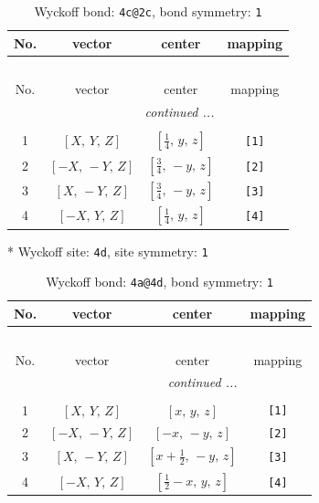 \documentclass[fleqn,8pt]{jsarticle}
\begin{document}
\begin{longtable}{cccc}
\caption{Wyckoff bond: {\tt 4c@2c}, bond symmetry: {\tt 1}}
 \\
 \hline \hline
No. & vector & center & mapping \\ \hline \endfirsthead

\multicolumn{3}{l}{\tablename\ \thetable{}} \\
 \hline \hline
No. & vector & center & mapping \\ \hline \endhead

 \hline \hline
\multicolumn{3}{r}{\footnotesize\it continued ...} \\ \endfoot

 \hline \hline
\multicolumn{3}{r}{} \\ \endlastfoot

1 & $\left[ X,\, Y,\, Z \right]$ & $\left[ \frac{1}{4},\, y,\, z \right]$ & {\tt [1]} \\ \hline
2 & $\left[ - X,\, - Y,\, Z \right]$ & $\left[ \frac{3}{4},\, - y,\, z \right]$ & {\tt [2]} \\ \hline
3 & $\left[ X,\, - Y,\, Z \right]$ & $\left[ \frac{3}{4},\, - y,\, z \right]$ & {\tt [3]} \\ \hline
4 & $\left[ - X,\, Y,\, Z \right]$ & $\left[ \frac{1}{4},\, y,\, z \right]$ & {\tt [4]} \\
\end{longtable}
* Wyckoff site: {\tt 4d}, site symmetry: {\tt 1}
\renewcommand{\arraystretch}{1.2}
\begin{longtable}{cccc}
\caption{Wyckoff bond: {\tt 4a@4d}, bond symmetry: {\tt 1}}
 \\
 \hline \hline
No. & vector & center & mapping \\ \hline \endfirsthead

\multicolumn{3}{l}{\tablename\ \thetable{}} \\
 \hline \hline
No. & vector & center & mapping \\ \hline \endhead

 \hline \hline
\multicolumn{3}{r}{\footnotesize\it continued ...} \\ \endfoot

 \hline \hline
\multicolumn{3}{r}{} \\ \endlastfoot

1 & $\left[ X,\, Y,\, Z \right]$ & $\left[ x,\, y,\, z \right]$ & {\tt [1]} \\ \hline
2 & $\left[ - X,\, - Y,\, Z \right]$ & $\left[ - x,\, - y,\, z \right]$ & {\tt [2]} \\ \hline
3 & $\left[ X,\, - Y,\, Z \right]$ & $\left[ x + \frac{1}{2},\, - y,\, z \right]$ & {\tt [3]} \\ \hline
4 & $\left[ - X,\, Y,\, Z \right]$ & $\left[ \frac{1}{2} - x,\, y,\, z \right]$ & {\tt [4]} \\
\end{longtable}
\end{document}
